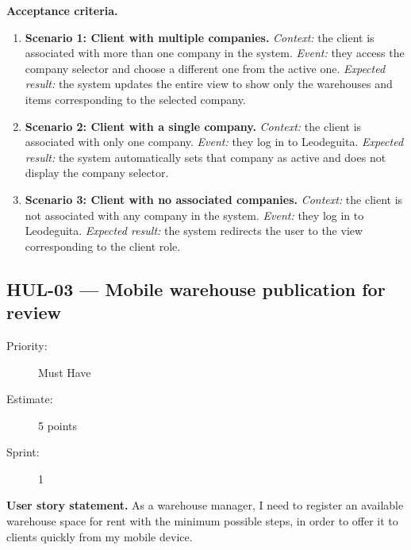 \documentclass[11pt,a4paper,oneside]{report}
\begin{document}
\textbf{Acceptance criteria.}
\begin{enumerate}
\item \textbf{Scenario 1: Client with multiple companies.} \emph{Context:} the client is associated with more than one company in the system. \emph{Event:} they access the company selector and choose a different one from the active one. \emph{Expected result:} the system updates the entire view to show only the warehouses and items corresponding to the selected company.
\item \textbf{Scenario 2: Client with a single company.} \emph{Context:} the client is associated with only one company. \emph{Event:} they log in to Leodeguita. \emph{Expected result:} the system automatically sets that company as active and does not display the company selector.
\item \textbf{Scenario 3: Client with no associated companies.} \emph{Context:} the client is not associated with any company in the system. \emph{Event:} they log in to Leodeguita. \emph{Expected result:} the system redirects the user to the view corresponding to the client role.
\end{enumerate}

\subsection{HUL-03 --- Mobile warehouse publication for review}
\label{req:HUL-03}
\begin{description}
\item[Priority:] Must Have \quad \item[Estimate:] 5 points \quad \item[Sprint:] 1
\end{description}

\textbf{User story statement.} As a warehouse manager, I need to register an available warehouse space for rent with the minimum possible steps, in order to offer it to clients quickly from my mobile device.
\end{document}
